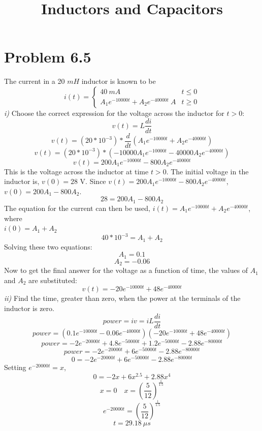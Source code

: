 \documentclass[12pt]{article}
\title{Inductors and Capacitors}
\date{}
\begin{document}
    \section*{Problem 6.5}
    \par The current in a 20 $mH$ inductor is known to be
    \[
    i(t) =
        \begin{cases}
            40\ mA & t \le 0 \\
            A_1 e^{-10000t} + A_2 e^{-40000t}\ A & t \ge 0
        \end{cases}
    \]
    \textit{i)} Choose the correct expression for the voltage across the inductor
    for $t > 0$:
    \[
        v(t) = L \frac{di}{dt}
    \]
    \[
        v(t) = (20*10^{-3}) * \frac{d}{dt} (A_1 e^{-10000t} + A_2 e^{-40000t})
    \]
    \[
        v(t) = (20*10^{-3}) * (-10000A_1e^{-10000t}-40000A_2e^{-40000t})
    \]
    \[
        v(t) = 200A_1e^{-10000t}-800A_2e^{-40000t}
    \]
    This is the voltage across the inductor at time $t > 0$. The initial
    voltage in the inductor is, $v(0) = 28$ V. Since $v(t) = 200A_1e^{-10000t}-800A_2e^{-40000t}
    $, $v(0) = 200A_1 - 800A_2$.
    \begin{equation}
        28 = 200A_1 - 800A_2
    \end{equation}
    The equation for the current can then be used, $i(t) = A_1 e^{-10000t} +
    A_2 e^{-40000t}$, where \\ $i(0) = A_1 + A_2$
    \begin{equation}
        40 * 10^{-3} = A_1 + A_2
    \end{equation}
    Solving these two equations:
    \[
    A_1 = 0.1
    \]
    \[
    A_2 = -0.06
    \]
    Now to get the final answer for the voltage as a function of time, the
    values of $ A_1$ and $ A_2$ are substituted:
    \[
        \boxed{v(t) = -20 e^{-10000t} + 48 e^{-40000t}}
    \]
    \textit{ii)} Find the time, greater than zero, when the power at the terminals
    of the inductor is zero.
    \[
        power = iv = iL \frac{di}{dt}
    \]
    \[
        power = (0.1e^{-10000t} - 0.06e^{-40000t})(-20e^{-10000t} + 48e^{-40000t})
    \]
    \[
        power = -2e^{-20000t} + 4.8e^{-50000t} + 1.2e^{-50000t} - 2.88e^{-80000t}
    \]
    \[
        power = -2e^{-20000t} + 6e^{-50000t} - 2.88e^{-80000t}
    \]
    \[
        0 = -2e^{-20000t} + 6e^{-50000t} - 2.88e^{-80000t}
    \]
    Setting $e^{-20000t} = x$,
    \[
        0 = -2x + 6x^{2.5} + 2.88x^{4}
    \]
    \[
        x = 0 \quad
        x = (\frac{5}{12})^{\frac{1}{1.5}}
    \]
    \[
        e^{-20000t} = (\frac{5}{12})^{\frac{1}{1.5}}
    \]
    \[
        \boxed{t = 29.18\ \mu s}
    \]
\end{document}
